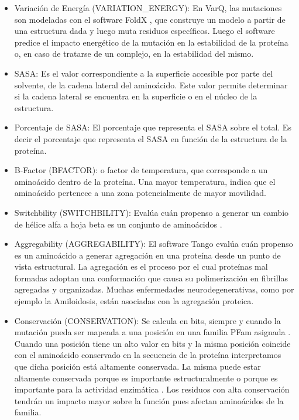 \begin{itemize}
    \item Variación de Energía (VARIATION\_ENERGY): En VarQ, las mutaciones son modeladas con el software FoldX \cite{Schymkowitz2005}, que construye un modelo a partir de una estructura dada y luego muta residuos específicos. Luego el software predice el impacto energético de la mutación en la estabilidad de la proteína o, en caso de tratarse de un complejo, en la estabilidad del mismo.
    \item SASA: Es el valor correspondiente a la superficie accesible por parte del solvente, de la cadena lateral del aminoácido. Este valor permite determinar si la cadena lateral se encuentra en la superficie o en el núcleo de la estructura.
    \item Porcentaje de SASA: El porcentaje que representa el SASA sobre el total. Es decir el porcentaje que representa el SASA en función de la estructura de la proteína.
    \item B-Factor (BFACTOR): o factor de temperatura, que corresponde a un aminoácido dentro de la proteína. Una mayor temperatura, indica que el aminoácido pertenece a una zona potencialmente de mayor movilidad.
    \item Switchbility (SWITCHBILITY): Evalúa cuán propenso a generar un cambio de hélice alfa a hoja beta es un conjunto de aminoácidos \cite{PMID:25082719}.
    \item Aggregability (AGGREGABILITY): El software Tango \cite{Fernandez-Escamilla2004} evalúa cuán
    propenso es un aminoácido a generar agregación en una proteína desde un punto de vista estructural. La agregación es el proceso por el cual proteínas mal formadas
    adoptan una conformación que causa su polimerización en fibrillas agregadas y organizadas. Muchas enfermedades neurodegenerativas, como por ejemplo la Amiloidosis, están asociadas con la agregación proteica.
    \item Conservación (CONSERVATION): Se calcula en bits, siempre y cuando la mutación pueda ser mapeada a una posición en una familia PFam asignada \cite{Finn2014}. Cuando una posición tiene un alto valor en bits y la misma posición coincide con el aminoácido conservado en la secuencia de la proteína interpretamos que dicha posición está altamente conservada. La misma puede estar altamente conservada porque es importante estructuralmente o porque es importante para la actividad enzimática \cite{Radusky2017}. Los residuos con alta conservación tendrán un impacto mayor sobre la función pues afectan aminoácidos de la familia.

\end{itemize}
